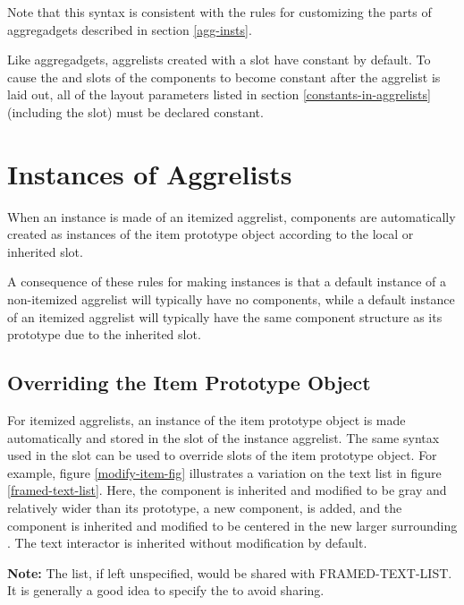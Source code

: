 Note that this syntax is consistent with the rules for customizing the
parts of aggregadgets described in section \ref{agg-insts}.

Like aggregadgets, aggrelists created with a  slot
have constant  by default.  To cause the  and
 slots of the components to become constant after the aggrelist
is laid out, all of the layout parameters listed in section
\ref{constants-in-aggrelists} (including the  slot) must be declared
constant.


\section{Instances of Aggrelists}
\label{modify-item-sec}
When an instance is made of an itemized aggrelist,
components are automatically created as instances of the item prototype
object according to the local or inherited  slot.

A consequence of these rules for making instances is that a default instance
of a non-itemized aggrelist will typically have no components, while a default
instance of an itemized aggrelist will typically have the same component
structure as its prototype due to the inherited  slot.

\subsection{Overriding the Item Prototype Object}
For itemized aggrelists, an instance of the item prototype object is made
automatically and stored in the  slot of the
instance aggrelist.  The same syntax used in the  slot can be
used to override slots of the item prototype object.  For example, figure
\ref{modify-item-fig} illustrates a variation on the text list in figure
\ref{framed-text-list}.  Here, the  component is inherited and
modified to be gray and relatively wider than its prototype, a new
component,  is added, and the  component is
inherited and modified to be centered in the new larger surrounding
.  The text interactor is inherited without modification by
default.

{\bf Note:} The  list, if left unspecified, would be shared
with FRAMED-TEXT-LIST.  It is generally a good idea to specify
the  to avoid sharing.

